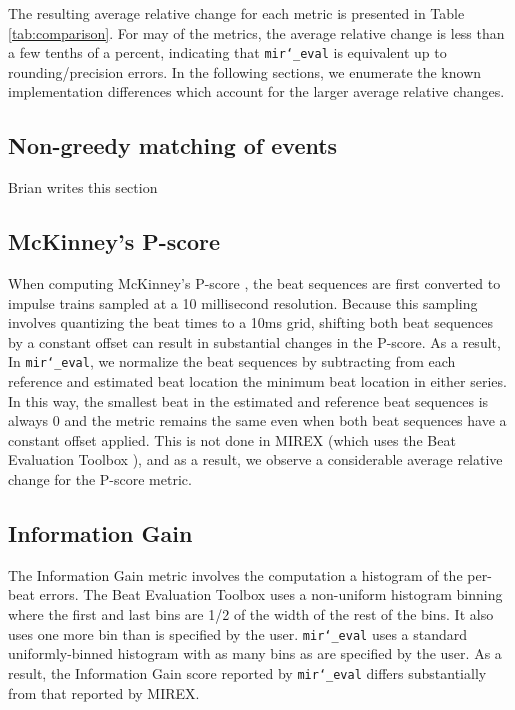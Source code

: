 \documentclass{article}
\def\mireval{\texttt{mir\char`_eval}}
\begin{document}
The resulting average relative change for each metric is presented in Table \ref{tab:comparison}.
For may of the metrics, the average relative change is less than a few tenths of a percent, indicating that \mireval{} is equivalent up to rounding/precision errors.
In the following sections, we enumerate the known implementation differences which account for the larger average relative changes.

\subsection{Non-greedy matching of events}

Brian writes this section

\subsection{McKinney's P-score}

When computing McKinney's P-score \cite{davies2009evaluation}, the beat sequences are first converted to impulse trains sampled at a 10 millisecond resolution.
Because this sampling involves quantizing the beat times to a 10ms grid, shifting both beat sequences by a constant offset can result in substantial changes in the P-score.
As a result, In \mireval{}, we normalize the beat sequences by subtracting from each reference and estimated beat location the minimum beat location in either series.
In this way, the smallest beat in the estimated and reference beat sequences is always $0$ and the metric remains the same even when both beat sequences have a constant offset applied.
This is not done in MIREX (which uses the Beat Evaluation Toolbox \cite{davies2009evaluation}), and as a result, we observe a considerable average relative change for the P-score metric.

\subsection{Information Gain}

The Information Gain metric \cite{davies2009evaluation} involves the computation a histogram of the per-beat errors.
The Beat Evaluation Toolbox uses a non-uniform histogram binning where the first and last bins are 1/2 of the width of the rest of the bins.
It also uses one more bin than is specified by the user.
\mireval{} uses a standard uniformly-binned histogram with as many bins as are specified by the user.
As a result, the Information Gain score reported by \mireval{} differs substantially from that reported by MIREX.
\end{document}
